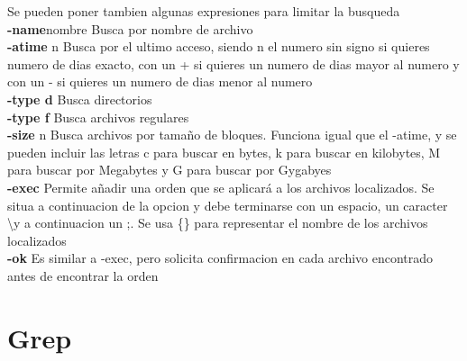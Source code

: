 \documentclass[11pt]{article}
\begin{document}
Se pueden poner tambien algunas expresiones para limitar la busqueda\\

\hspace{2cm} \textbf{-name}nombre \hspace{2cm} Busca por nombre de archivo\\

\hspace{2cm}\textbf{-atime} n\hspace{2cm} Busca por el ultimo acceso, siendo n el numero sin signo si quieres numero de dias exacto, con un + si quieres un numero de dias mayor al numero y con un - si quieres un numero de dias menor al numero\\

\hspace{2cm}\textbf{-type d} \hspace{2cm} Busca directorios\\

\hspace{2cm}\textbf{-type f} \hspace{2cm} Busca archivos regulares\\

\hspace{2cm}\textbf{-size}
 n \hspace{2cm} Busca archivos por tamaño de bloques. Funciona igual que el -atime, y se pueden incluir las letras c para buscar en bytes, k para buscar en kilobytes, M para buscar por Megabytes y G para buscar por Gygabyes \\
 
 \hspace{2cm} \textbf{-exec} \hspace{2cm} Permite añadir una orden que se aplicará a los archivos localizados. Se situa a continuacion de la opcion y debe terminarse con un espacio, un caracter \textbackslash y a continuacion un ;. Se usa \{\} para representar el nombre de los archivos localizados\\
 
 \hspace{2cm} \textbf{-ok} \hspace{2cm} Es similar a -exec, pero solicita confirmacion en cada archivo encontrado antes de encontrar la orden \\
 
 \section {Grep}
 
\end{document}

